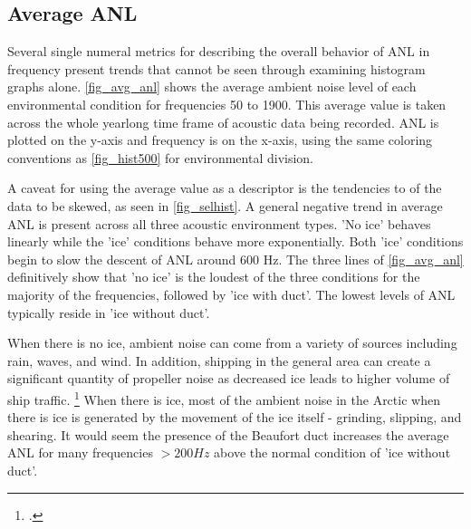 \subsection{Average ANL} \label{sec_avg_anl}
Several single numeral metrics for describing the overall behavior of ANL in frequency present trends that cannot be seen through examining histogram graphs alone. \autoref{fig_avg_anl} shows the average ambient noise level of each environmental condition for frequencies 50 to 1900. This average value is taken across the whole yearlong time frame of acoustic data being recorded. ANL is plotted on the y-axis and frequency is on the x-axis, using the same coloring conventions as \autoref{fig_hist500} for environmental division.

A caveat for using the average value as a descriptor is the tendencies to of the data to be skewed, as seen in \autoref{fig_selhist}. A general negative trend in average ANL is present across all three acoustic environment types. 'No ice' behaves linearly while the 'ice' conditions behave more exponentially. Both 'ice' conditions begin to slow the descent of ANL around 600 Hz. The three lines of \autoref{fig_avg_anl} definitively show that 'no ice' is the loudest of the three conditions for the majority of the frequencies, followed by 'ice with duct'. The lowest levels of ANL typically reside in 'ice without duct'.

When there is no ice, ambient noise can come from a variety of sources including rain, waves, and wind. In addition, shipping in the general area can create a significant quantity of propeller noise as decreased ice leads to higher volume of ship traffic. \footcite[]{ship_traffic} When there is ice, most of the ambient noise in the Arctic when there is ice is generated by the movement of the ice itself - grinding, slipping, and shearing. It would seem the presence of the Beaufort duct increases the average ANL for many frequencies $>200 Hz$ above the normal condition of 'ice without duct'. 



